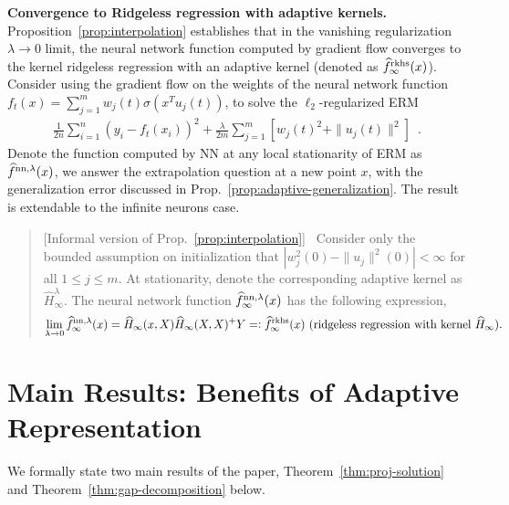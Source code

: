 \documentclass[11pt]{article}
\numberwithin{equation}{section}
\begin{document}
\noindent \textbf{Convergence to Ridgeless regression with adaptive kernels.} Proposition~\ref{prop:interpolation} establishes that in the vanishing regularization $\lambda \rightarrow 0$ limit, the neural network function computed by gradient flow converges to the kernel ridgeless regression with an adaptive kernel (denoted as $\widehat{f}^{\rm rkhs}_{\infty}(x)$). Consider using the gradient flow on the weights of the neural network function $f_t(x) = \sum_{j=1}^m w_j(t) \sigma(x^T u_j(t))$, to solve the $\ell_2$-regularized ERM
    \begin{align*}
        \frac{1}{2n} \sum_{i=1}^n (y_i - f_t(x_i))^2 + \frac{\lambda}{2m} \sum_{j=1}^m \left[ w_j(t)^2 + \| u_j(t) \|^2 \right] \enspace.
    \end{align*}
Denote the function computed by NN at any local stationarity of ERM as $\widehat{f}^{{\rm nn}, \lambda}(x)$, we answer the extrapolation question at a new point $x$, with the generalization error discussed in Prop.~\ref{prop:adaptive-generalization}. The result is extendable to the infinite neurons case.
\begin{quote}[Informal version of Prop.~\ref{prop:interpolation}]~
    Consider only the bounded assumption on initialization that $|w_j^2(0) - \|u_j\|^2(0)| <\infty$ for all $1\leq j\leq m$.
    At stationarity, denote the corresponding adaptive kernel as $\widehat{H}_{\infty}^{\lambda}$.
    The neural network function $\widehat{f}^{{\rm nn}, \lambda}_{\infty} (x)$ has the following expression, 
    \begin{align*}
         \lim_{\lambda \rightarrow 0} \widehat{f}^{{\rm nn}, \lambda}_{\infty} (x) = \widehat{H}_{\infty}(x, X) \widehat{H}_{\infty}(X, X)^{+} Y =: \widehat{f}^{\rm rkhs}_{\infty}(x) ~\text{(ridgeless regression with kernel $\widehat{H}_\infty$)}.
    \end{align*}
\end{quote}



\section{Main Results: Benefits of Adaptive Representation}
\label{sec:adaptive}

We formally state two main results of the paper, Theorem~\ref{thm:proj-solution} and Theorem~\ref{thm:gap-decomposition} below. %
\end{document}
